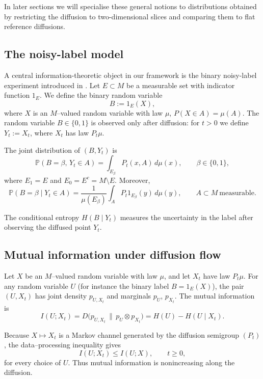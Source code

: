 \documentclass[11pt]{amsart}
\theoremstyle{definition}
\theoremstyle{remark}
\begin{document}
\medskip

In later sections we will specialise these general notions to distributions obtained by restricting
the diffusion to two-dimensional slices and comparing them to flat reference diffusions.


\subsection{The noisy-label model}
\label{subsec:noisy-label-model}
A central information-theoretic object in our framework is the binary noisy-label experiment
introduced in \cite{Sangha2025Isoperimetry}. Let $E\subset M$ be a measurable set with indicator
function $1_E$. We define the binary random variable
\[
B := 1_E(X),
\]
where $X$ is an $M$--valued random variable with law $\mu$, $P(X\in A)=\mu(A)$. The random variable $B\in\{0,1\}$ is observed
only after diffusion: for $t>0$ we define $Y_t := X_t$, where $X_t$ has law $P_t\mu$.

The joint distribution of $(B,Y_t)$ is
\[
\mathbb{P}(B=\beta,\, Y_t\in A)
= \int_{E_\beta} P_t(x,A)\, d\mu(x),
\qquad \beta\in\{0,1\},
\]
where $E_1=E$ and $E_0=E^c = M\setminus E$. Moreover,
\[
\mathbb{P}(B=\beta \mid Y_t \in A)
= \frac{1}{\mu(E_\beta)} \int_A P_t 1_{E_\beta}(y)\, d\mu(y),
\qquad A\subset M\ \text{measurable}.
\]

The conditional entropy $H(B\mid Y_t)$ measures the uncertainty in the label after observing
the diffused point $Y_t$. 

\subsection{Mutual information under diffusion flow}

Let $X$ be an $M$--valued random variable with law $\mu$, and let $X_t$ have law $P_t\mu$.
For any random variable $U$ (for instance the binary label $B=1_E(X)$), the pair $(U,X_t)$
has joint density $p_{U,X_t}$ and marginals $p_U$, $p_{X_t}$. The mutual information is
\[
I(U;X_t)
= D\big(p_{U,X_t} \,\big\|\, p_U \otimes p_{X_t}\big)
= H(U) - H(U\mid X_t).
\]

Because $X \mapsto X_t$ is a Markov channel generated by the diffusion semigroup $(P_t)$,
the data--processing inequality \cite{CoverThomas2006} gives
\begin{equation}\label{eq:MI-monotone}
I(U;X_t) \le I(U;X),
\qquad t \ge 0,
\end{equation}
for every choice of $U$. Thus mutual information is nonincreasing along the diffusion.
\end{document}
